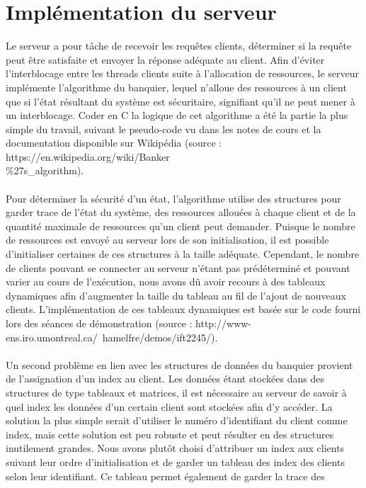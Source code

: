 \documentclass[11pt]{article}
\begin{document}
\section*{ Implémentation du serveur }
\setlength{\parindent}{20pt}
Le serveur a pour tâche de recevoir les requêtes clients, déterminer si la requête peut être satisfaite et envoyer la réponse adéquate au 
client. Afin d’éviter l’interblocage entre les threads clients suite à l’allocation de ressources, le serveur implémente l’algorithme du 
banquier, lequel n’alloue des ressources à un client que si l’état résultant du système est sécuritaire, signifiant qu’il ne peut mener à un 
interblocage. Coder en C la logique de cet algorithme a été la partie la plus simple du travail, suivant le pseudo-code vu dans les notes de 
cours et la documentation disponible sur Wikipédia (source : https://en.wikipedia.org/wiki/Banker\\\%27s\_algorithm).\\
\\
Pour déterminer la sécurité d’un état, l’algorithme utilise des structures pour garder trace de l’état du système, des ressources allouées à 
chaque client et de la quantité maximale de ressources qu’un client peut demander. Puisque le nombre de ressources est envoyé au serveur lors de 
son initialisation, il est possible d’initialiser certaines de ces structures à la taille adéquate. Cependant, le nombre de clients pouvant se 
connecter au serveur n’étant pas prédéterminé et pouvant varier au cours de l’exécution, nous avons dû avoir recours à des tableaux dynamiques 
afin d’augmenter la taille du tableau au fil de l’ajout de nouveaux clients. L’implémentation de ces tableaux dynamiques est basée sur le code 
fourni lors des séances de démonstration (source : http://www-ens.iro.umontreal.ca/~hamelfre/demos/ift2245/).\\ 
\\
Un second problème en lien avec les structures de données du banquier provient de l’assignation d’un index au client. Les données étant stockées 
dans des structures de type tableaux et matrices, il est nécessaire au serveur de savoir à quel index les données d'un certain client sont 
stockées afin d’y accéder. La solution la plus simple serait d’utiliser le numéro d’identifiant du client comme index, mais cette solution est 
peu robuste et peut résulter en des structures inutilement grandes. Nous avons plutôt choisi d’attribuer un index aux clients suivant leur ordre 
d’initialisation et de garder un tableau des index des clients selon leur identifiant. Ce tableau permet également de garder la trace des 
\end{document}
